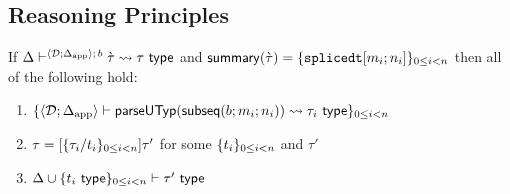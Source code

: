 \subsection{Reasoning Principles}\label{appendix:SES-reasoning-principles}
\begin{lemma} 
\label{thm:proto-type-expansion-decomposition-SES}
If $\Delta\vdash^{\langle \mathcal{D}; \Delta_\text{app} \rangle;\,b} \grave{\tau} \leadsto \tau~\mathsf{type}$ and $\mathsf{summary}(\grave{\tau}) = \{\texttt{splicedt}[m_i; n_i]\}_{0 \leq i < n}$ then all of the following hold:
\begin{enumerate}
\item $\{\langle \mathcal{D}; \Delta_\text{app} \rangle \vdash 
  \mathsf{parseUTyp}(\mathsf{subseq}(b; m_i; n_i))
 \leadsto \tau_i~\mathsf{type}\}_{0 \leq i < n}$
\item $\tau = [\{\tau_i/t_i\}_{0 \leq i < n}]\tau'$ for some $\{t_i\}_{0 \leq i < n}$ and $\tau'$
\item $\Delta \cup \{t_i~\mathsf{type}\}_{0 \leq i < n} \vdash \tau'~\mathsf{type}$
\end{enumerate}
\end{lemma}
